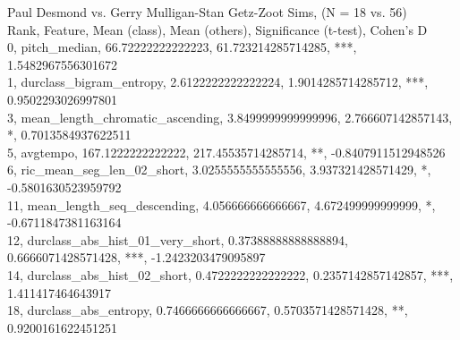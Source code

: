 Paul Desmond vs. Gerry Mulligan-Stan Getz-Zoot Sims, (N = 18 vs. 56)\\
Rank, Feature, Mean (class), Mean (others), Significance (t-test), Cohen's D\\
0, pitch_median, 66.72222222222223, 61.723214285714285, ***, 1.5482967556301672\\
1, durclass_bigram_entropy, 2.6122222222222224, 1.9014285714285712, ***, 0.9502293026997801\\
3, mean_length_chromatic_ascending, 3.8499999999999996, 2.766607142857143, *, 0.7013584937622511\\
5, avgtempo, 167.1222222222222, 217.45535714285714, **, -0.8407911512948526\\
6, ric_mean_seg_len_02_short, 3.0255555555555556, 3.937321428571429, *, -0.5801630523959792\\
11, mean_length_seq_descending, 4.056666666666667, 4.672499999999999, *, -0.6711847381163164\\
12, durclass_abs_hist_01_very_short, 0.37388888888888894, 0.6666071428571428, ***, -1.2423203479095897\\
14, durclass_abs_hist_02_short, 0.4722222222222222, 0.2357142857142857, ***, 1.411417464643917\\
18, durclass_abs_entropy, 0.7466666666666667, 0.5703571428571428, **, 0.9200161622451251\\
